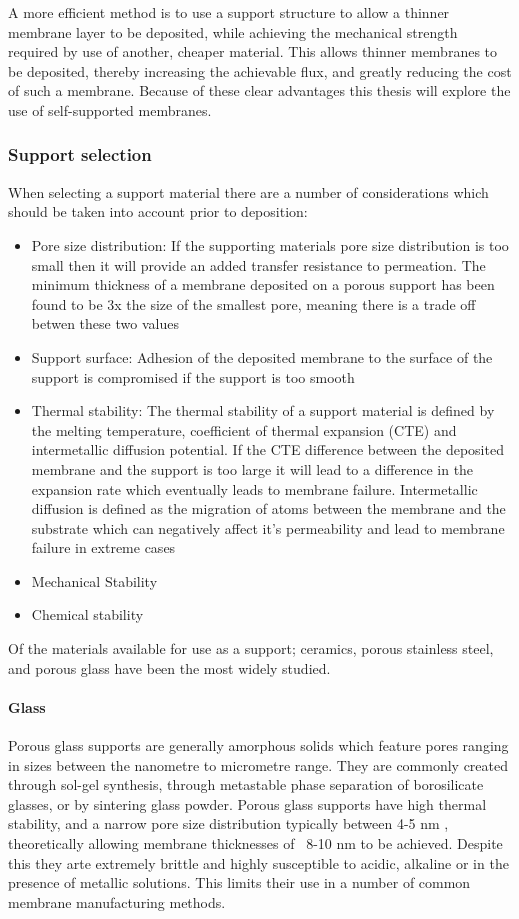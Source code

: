 A more efficient method is to use a support structure to allow a thinner membrane layer to 
be deposited, while achieving the mechanical strength required by use of another, cheaper 
material. This allows thinner membranes to be deposited, thereby increasing the achievable 
flux, and greatly reducing the cost of such a membrane.\cite{NathanW.Ockwig2007a} Because of these clear advantages 
this thesis will explore the use of self-supported membranes. 

\subsubsection{Support selection}
When selecting a support material there are a number of considerations which should be taken 
into account prior to deposition:
\begin{itemize}
\item Pore size distribution: If the supporting materials pore size distribution is too small then it will 
provide an added transfer resistance to permeation. The minimum thickness of a membrane deposited on a porous support has been found to be 3x the size of the smallest pore, \cite{Mardilovich2002} meaning there is a trade off betwen these two values
\item Support surface: Adhesion of the deposited membrane to the surface of the support is 
compromised if the support is too smooth
\item Thermal stability: The thermal stability of a support material is defined by the 
melting temperature, coefficient of thermal expansion (CTE) and intermetallic diffusion 
potential. If the CTE difference between the deposited membrane and the support is too large 
it will lead to a difference in the expansion rate which eventually leads to membrane failure. Intermetallic diffusion is defined as the migration of atoms between the membrane and the substrate which can negatively affect it’s permeability and lead to membrane failure in extreme cases
\item Mechanical Stability
\item Chemical stability
\end{itemize}
Of the materials available for use as a support; ceramics, porous stainless steel, and porous glass have been the most widely studied. 

\paragraph*{Glass}
Porous glass supports are generally amorphous solids which feature pores ranging in sizes between the nanometre to micrometre range. They are commonly created through sol-gel synthesis, through metastable phase separation of borosilicate glasses, or by sintering glass powder. Porous glass supports have high thermal stability, and a narrow pore size distribution typically between 4-5 nm \cite{SCHLUNDER2006113} \cite{UEMIYA1991303}, theoretically allowing membrane thicknesses of ~8-10 nm to be achieved. \cite{Mardilovich2002} Despite this they arte extremely brittle and highly susceptible to acidic, alkaline or in the presence of metallic solutions. This limits their use in a number of common membrane manufacturing methods. 

